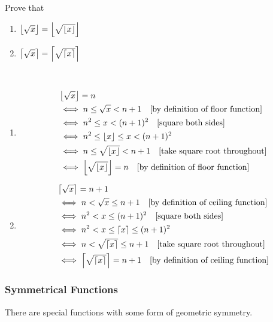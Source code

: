 \begin{exercise}{}{}
Prove that
\begin{enumerate}[label=(\alph*)]
\item $\left\lfloor \sqrt{x} \right\rfloor=\left\lfloor \sqrt{\left\lfloor x \right\rfloor} \right\rfloor$
\item $\left\lceil \sqrt{x} \right\rceil=\left\lceil \sqrt{\left\lceil x \right\rceil} \right\rceil$
\end{enumerate}
\end{exercise}

\begin{solution} \
\begin{enumerate}[label=(\alph*)]
\item \begin{align*}
&\left\lfloor \sqrt{x} \right\rfloor=n \\
&\iff n\le\sqrt{x}<n+1 \quad \text{[by definition of floor function]} \\
&\iff n^2\le x<(n+1)^2 \quad \text{[square both sides]} \\
&\iff n^2\le\left\lfloor x \right\rfloor\le x<(n+1)^2 \\
&\iff n\le\sqrt{\left\lfloor x \right\rfloor}<n+1 \quad \text{[take square root throughout]} \\
&\iff \left\lfloor \sqrt{\left\lfloor x \right\rfloor} \right\rfloor=n \quad \text{[by definition of floor function]}
\end{align*}

\item \begin{align*}
&\left\lceil \sqrt{x} \right\rceil=n+1 \\
&\iff n<\sqrt{x}\le n+1 \quad \text{[by definition of ceiling function]} \\
&\iff n^2<x\le(n+1)^2 \quad \text{[square both sides]} \\
&\iff n^2<x\le\left\lceil x \right\rceil\le(n+1)^2 \\
&\iff n<\sqrt{\left\lceil x \right\rceil}\le n+1 \quad \text{[take square root throughout]} \\
&\iff \left\lceil \sqrt{\left\lceil x \right\rceil} \right\rceil=n+1 \quad \text{[by definition of ceiling function]}
\end{align*}
\end{enumerate}
\end{solution}

\subsubsection{Symmetrical Functions}
There are special functions with some form of geometric symmetry.

